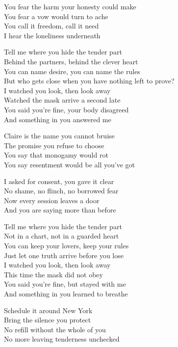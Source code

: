 \begin{lyrics}
You fear the harm your honesty could make\\
You fear a vow would turn to ache\\
You call it freedom, call it need\\
I hear the loneliness underneath

Tell me where you hide the tender part\\
Behind the partners, behind the clever heart\\
You can name desire, you can name the rules\\
But who gets close when you have nothing left to prove?\\
I watched you look, then look away\\
Watched the mask arrive a second late\\
You said you’re fine, your body disagreed\\
And something in you answered me

Claire is the name you cannot bruise\\
The promise you refuse to choose\\
You say that monogamy would rot\\
You say resentment would be all you’ve got

I asked for consent, you gave it clear\\
No shame, no flinch, no borrowed fear\\
Now every session leaves a door\\
And you are saying more than before

Tell me where you hide the tender part\\
Not in a chart, not in a guarded heart\\
You can keep your lovers, keep your rules\\
Just let one truth arrive before you lose\\
I watched you look, then look away\\
This time the mask did not obey\\
You said you’re fine, but stayed with me\\
And something in you learned to breathe

Schedule it around New York\\
Bring the silence you protect\\
No refill without the whole of you\\
No more leaving tenderness unchecked
\end{lyrics}
